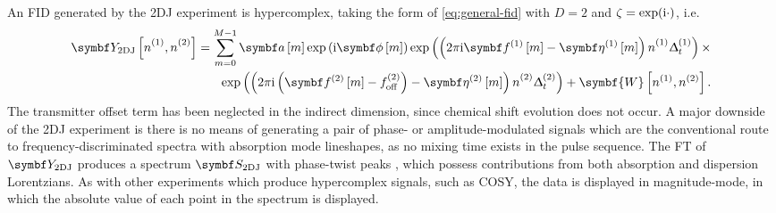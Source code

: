 An FID generated by the \ac{2DJ} experiment is hypercomplex, taking the form of
\eqref{eq:general-fid} with $D=2$ and $\zeta = \exp(\mathrm{i}\cdot)$, i.e.
\begin{equation}%
    \begin{split}%
        \jresfid\idxnonentwo =
        \sum_{m=0}^{M-1} \bdam \exp\left( \iu \bdphim \right)
            \exp\left(\left(2 \pi \iu \bdfonem
            - \bdetaonem\right) {\none}_{\vphantom{t}} \Dtone\right) \times \\
            \exp\left(\left(2 \pi \iu  \left(
            \bdftwom - \fofftwo \right)
            - \bdetatwom\right) {\ntwo}_{\vphantom{t}} \Dttwo\right)
            + \symbf{W}\left[n^{(1)}, n^{(2)}\right].
    \end{split}%
    \label{eq:jres-fid}
\end{equation}%
The transmitter offset term has been neglected in the indirect dimension, since chemical shift evolution does not occur.
A major downside of the \ac{2DJ} experiment is there is no means of generating
a pair of phase- or amplitude-modulated signals which are the
conventional route to frequency-discriminated spectra with absorption mode lineshapes, as no mixing time exists in the pulse sequence. The FT of $\jresfid$ produces a spectrum
$\jresspec$ with phase-twist peaks , which possess contributions from both absorption
and dispersion Lorentzians.
As with other experiments which produce hypercomplex signals, such as \ac{COSY}, the data is displayed in magnitude-mode, in which the absolute value of each point in the spectrum is displayed.

